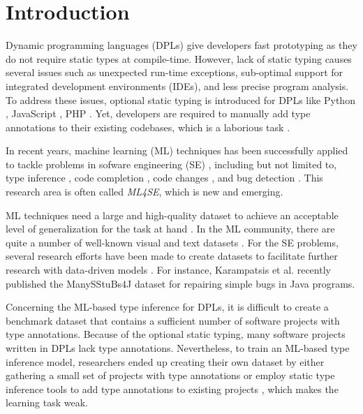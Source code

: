 \documentclass[10pt, conference]{IEEEtran}
\begin{document}
\section{Introduction}
Dynamic programming languages (DPLs) give developers fast prototyping as they do not require static types at compile-time. However, lack of static typing causes several issues such as unexpected run-time exceptions, sub-optimal support for integrated development environments (IDEs), and less precise program analysis. To address these issues, optional static typing is introduced for DPLs like Python \cite{van2014pep}, JavaScript \cite{bierman2014understanding}, PHP \cite{klingstrom2020type}. Yet, developers are required to manually add type annotations to their existing codebases, which is a laborious task \cite{ore2018assessing}.

In recent years, machine learning (ML) techniques has been successfully applied to tackle problems in sofware engineering (SE) \cite{allamanis2018survey}, including but not limited to, type inference \cite{allamanis2020typilus, pradel2019typewriter}, code completion \cite{svyatkovskiy2019pythia}, code changes \cite{tufano2019learning}, and bug detection \cite{qiao2020deep}. This research area is often called \textit{ML4SE}, which is new and emerging.

ML techniques need a large and high-quality dataset to achieve an acceptable level of generalization for the task at hand \cite{sun2017revisiting}. In the ML community, there are quite a number of well-known visual and text datasets \cite{pouyanfar2018survey}. For the SE problems, several research efforts have been made to create datasets to facilitate further research with data-driven models \cite{githubCorpus2013}. For instance, Karampatsis et al. \cite{karampatsis2020often} recently published the ManySStuBs4J dataset for repairing simple bugs in Java programs. 

Concerning the ML-based type inference for DPLs, it is difficult to create a benchmark dataset that contains a sufficient number of software projects with type annotations. Because of the optional static typing, many software projects written in DPLs lack type annotations. Nevertheless, to train an ML-based type inference model, researchers ended up creating their own dataset by either gathering a small set of projects with type annotations \cite{pradel2019typewriter} or employ static type inference tools to add type annotations to existing projects \cite{allamanis2020typilus}, which makes the learning task weak.
\end{document}
